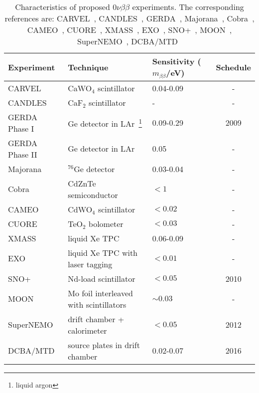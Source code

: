 \begin{table}[htbp]
  \centering
  \caption{Characteristics of proposed $0\nu\beta\beta$ experiments.                         The corresponding references are: CARVEL~\cite{Zde05},     CANDLES~\cite{Hir08}, GERDA~\cite{Sch05,Cal06}, Majorana~\cite{Aal04},     Cobra~\cite{Kie03}, CAMEO~\cite{Bel01}, CUORE~\cite{Ard05},     XMASS~\cite{Nak02}, EXO~\cite{Dan00}, SNO+~\cite{Zub07},             MOON~\cite{Nak06}, SuperNEMO~\cite{Sne08}, DCBA/MTD~\cite{Ish07}}
  \label{tab:gerda:comp}
  \begin{minipage}{\linewidth}
    \begin{tabular}{lllc} \hline Experiment & Technique & Sensitivity       ($m_{\beta\beta}$/eV) & Schedule \\\hline
      CARVEL & CaWO$_{4}$  scintillator & 0.04-0.09 & - \\
      CANDLES & CaF$_{2}$ scintillator & - & - \\
      GERDA Phase I & Ge detector in LAr~\footnote{liquid argon} &       0.09-0.29 & 2009 \\
      GERDA Phase II & Ge detector in LAr & 0.05 & - \\
      Majorana & $^{76}$Ge detector & 0.03-0.04 & - \\
      Cobra & CdZnTe semiconductor & $< 1$ & - \\
      CAMEO & CdWO$_{4}$ scintillator & $< 0.02$ & - \\
      CUORE & TeO$_{2}$ bolometer & $< 0.03$ & - \\
      XMASS & liquid Xe TPC & 0.06-0.09 & - \\
      EXO & liquid Xe TPC with laser tagging & $< 0.01$ & - \\
      SNO+ & Nd-load scintillator & $< 0.05$ & 2010 \\ 
      MOON & Mo foil interleaved with scintillators & $\sim0.03$ & -\\
      SuperNEMO & drift chamber + calorimeter & $< 0.05$ & 2012 \\
      DCBA/MTD & source plates in drift chamber & 0.02-0.07 & 2016 \\
    \end{tabular}
  \end{minipage}
\end{table}

